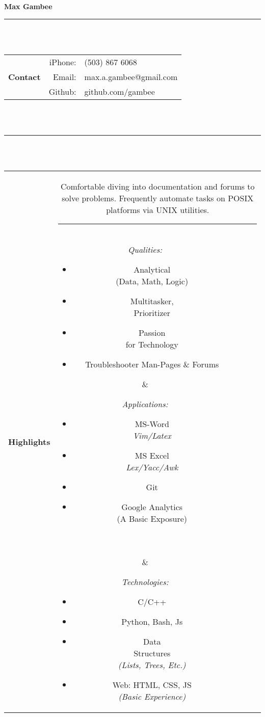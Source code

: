 \documentclass[12pt]{article}
\begin{document}
\Large\textbf{Max Gambee} \normalsize\\
\rule{5.5in}{1pt}\\\\
\begin{tabular}{r|rl}
\multirow{3}{*}{\textbf{Contact}} & iPhone: & (503) 867 6068\\
& Email: & max.a.gambee@gmail.com\\
& Github: & github.com/gambee\\
\end{tabular}
\\\\\rule{5.5in}{1pt}\\\\
\begin{tabular}{r|c|c|c}
\multirow{2}{*}{\textbf{Highlights}}
& \multicolumn{3}{|c}{\parbox{4.32in}{\footnotesize 
	Comfortable diving into documentation and forums
	to solve problems. Frequently automate tasks on POSIX platforms via UNIX utilities.
	\\\rule[0.5em]{4.25in}{0.3pt}
}}\\
& \parbox{1.4in}{\footnotesize \textit{Qualities:}
	\begin{itemize}
	\item Analytical\\
	\tiny(Data, Math, Logic)\footnotesize
	\item Multitasker,\\ Prioritizer
	\item Passion \\for Technology
	\item Troubleshooter Man-Pages \& Forums
	\end{itemize}}
& \parbox{1.5in}{\footnotesize \textit{Applications:}
	\begin{itemize}
		\item MS-Word\\\textit{Vim/Latex}
		\item MS Excel\\\textit{Lex/Yacc/Awk}
		\item Git
		\item Google Analytics\\
			\tiny (A Basic Exposure)\footnotesize\\\\\tiny\vfill~\\
			

	\end{itemize}}
& \parbox{1.3in}{\footnotesize \textit{Technologies:}
	\begin{itemize}
	\item C/C++
	\item Python, Bash, Js
	\item Data \\Structures\\\tiny\textit{(Lists, Trees, Etc.)}\footnotesize
	\item Web: HTML, CSS, JS\\\tiny\textit{(Basic Experience)}\footnotesize
	\end{itemize}}\\
\end{tabular}
\end{document}

